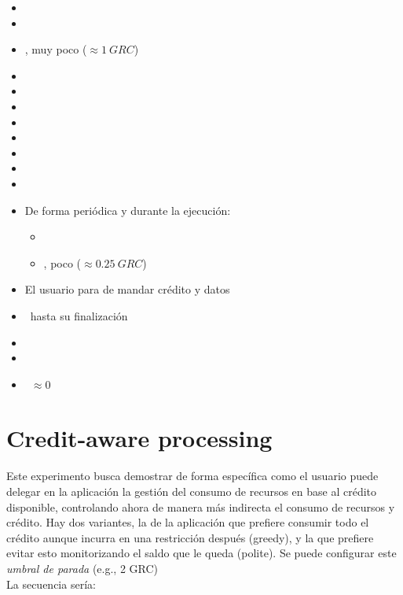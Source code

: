 \documentclass[preprint,3p]{elsarticle}
\begin{document}
\begin{itemize}
	\setlength\itemsep{0em}
	\item \ContainerUp
	\item \UserNoCredit
	\item \UserSendsCredit, muy poco ($\approx 1~GRC$)
	\item \DataGenerationPartial
	\item \UserAccountingActivated
	\item \ServerlessDown
	\item \AccountingIdle
	\item \AppStart
	\item \ServerlessUp
	\item \AccountingConsumes
	\item \AppRuns
	\item De forma periódica y durante la ejecución:
	\begin{itemize}
		\item \DataGenerationPartial
		\item \UserSendsCredit, poco ($ \approx 0.25~GRC$)
	\end{itemize}
	\item El usuario para de mandar crédito y datos
	\item \AppRuns~hasta su finalización
	\item \ServerlessDown
	\item \AccountingIdle
	\item \AccountingCredit~$\approx 0$
\end{itemize}


\newpage
\section{Credit-aware processing}

\noindent 
Este experimento busca demostrar de forma específica como el usuario puede delegar en la aplicación la gestión del consumo de recursos en base al crédito disponible, controlando ahora de manera más indirecta el consumo de recursos y crédito. Hay dos variantes, la de la aplicación que prefiere consumir todo el crédito aunque incurra en una restricción después (greedy), y la que prefiere evitar esto monitorizando el saldo que le queda (polite). Se puede configurar este \textit{umbral de parada} (e.g., 2 GRC)\\

\noindent 
La secuencia sería:
\end{document}
